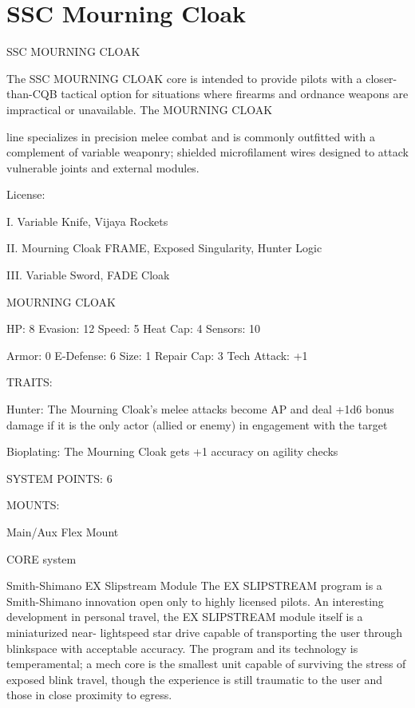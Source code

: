 \section{SSC Mourning Cloak}

                                    SSC MOURNING CLOAK

The SSC MOURNING CLOAK core is intended to provide pilots with a closer-than-CQB tactical option for
situations where firearms and ordnance weapons are impractical or unavailable. The MOURNING CLOAK

line specializes in precision melee combat and is commonly outfitted with a complement of variable
weaponry; shielded microfilament wires designed to attack vulnerable joints and external modules.


                                                  License:

I. Variable Knife, Vijaya Rockets

II. Mourning Cloak FRAME, Exposed Singularity, Hunter Logic

III. Variable Sword, FADE Cloak


                                           MOURNING CLOAK

  HP: 8          Evasion: 12                          Speed: 5           Heat Cap: 4        Sensors: 10

  Armor: 0       E-Defense: 6                         Size: 1            Repair Cap: 3      Tech Attack:
                                                                                            +1

                                                   TRAITS:

  Hunter: The Mourning Cloak’s melee attacks become AP and deal +1d6 bonus damage if it is the only
  actor (allied or enemy) in engagement with the target

  Bioplating: The Mourning Cloak gets +1 accuracy on agility checks

                                             SYSTEM POINTS: 6

                                                  MOUNTS:

  Main/Aux                                             Flex Mount

                                                CORE system




                                     Smith-Shimano EX Slipstream Module
   The EX SLIPSTREAM program is a Smith-Shimano innovation open only to highly licensed pilots. An
  interesting development in personal travel, the EX SLIPSTREAM module itself is a miniaturized near-
  lightspeed star drive capable of transporting the user through blinkspace with acceptable accuracy. The
  program and its technology is temperamental; a mech core is the smallest unit capable of surviving the
  stress of exposed blink travel, though the experience is still traumatic to the user and those in close
  proximity to egress.

